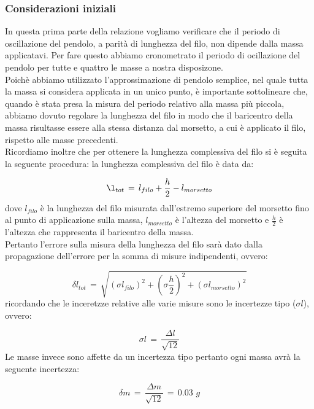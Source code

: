 \subsubsection{Considerazioni iniziali}
In questa prima parte della relazione vogliamo verificare che il periodo di oscillazione del pendolo, a parità di lunghezza del filo, non dipende dalla massa applicatavi.
Per fare questo abbiamo cronometrato il periodo di ocillazione del pendolo per tutte e quattro le masse a nostra disposizone.\\
Poichè abbiamo utilizzato l'approssimazione di pendolo semplice, nel quale tutta la massa si considera applicata in un unico punto, è importante sottolineare che, quando è stata presa la misura del periodo relativo alla massa più piccola, abbiamo dovuto regolare la lunghezza del filo in modo che il baricentro della massa risultasse essere alla stessa distanza dal morsetto, a cui è applicato il filo, rispetto alle masse precedenti.\\
Ricordiamo inoltre che per ottenere la lunghezza complessiva del filo si è seguita la seguente procedura: la lunghezza complessiva del filo è data da:

\begin{equation}
	\l_{tot} \,=\, l_{filo} + \frac{h}{2} - l_{morsetto}
\end{equation}
%
dove $l _{filo}$ è la lunghezza del filo misurata dall'estremo superiore del morsetto fino al punto di applicazione sulla massa, $l_{morsetto}$ è l'altezza del morsetto e $\frac{h}{2}$ è l'altezza che rappresenta il baricentro della massa.\\
Pertanto l'errore sulla misura della lunghezza del filo sarà dato dalla propagazione dell'errore per la somma di misure indipendenti, ovvero:

\begin{equation*}
	\delta l_{tot} \,=\, \sqrt{(\sigma l_{filo})^2 + (\sigma \frac{h}{2})^2 + (\sigma l_{morsetto})^2}
\end{equation*}
%
ricordando che le inceretzze relative alle varie misure sono le incertezze tipo ($\sigma l$), ovvero:

\begin{equation*}
	\sigma l \,=\, \frac{\Delta l}{\sqrt{12}}
\end{equation*}
%
Le masse invece sono affette da un incertezza tipo pertanto ogni massa avrà la seguente incertezza:

\begin{equation*}
	\delta m \,=\, \frac{\Delta m}{\sqrt{12}} \,=\, 0.03 \,\, g
\end{equation*}

